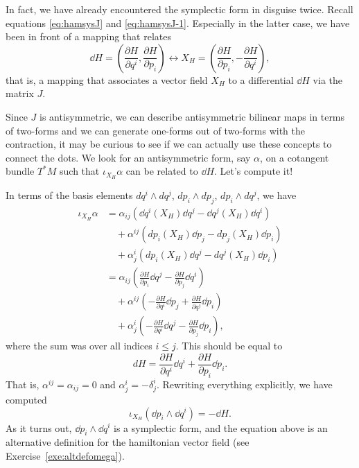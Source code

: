 \documentclass[english,fontsize=11pt,paper=b5]{scrbook}
\theoremstyle{definition}
\begin{document}
    In fact, we have already encountered the symplectic form in disguise twice.
    Recall equations \eqref{eq:hamsysJ} and \eqref{eq:hamsysJ-1}. Especially in the latter case, we have been in front of a mapping that relates
    \begin{equation}
      \dd H = \left(\frac{\partial H}{\partial q^i}, \frac{\partial H}{\partial p_i}\right) \leftrightarrow X_H = \left(\frac{\partial H}{\partial p_i}, - \frac{\partial H}{\partial q^i}\right),
    \end{equation}
    that is, a mapping that associates a vector field $X_H$ to a differential $\dd H$ via the matrix $J$.

    Since $J$ is antisymmetric, we can describe antisymmetric bilinear maps in terms of two-forms and we can generate one-forms out of two-forms with the contraction, it may be curious to see if we can actually use these concepts to connect the dots.
    We look for an antisymmetric form, say $\alpha$, on a cotangent bundle $T^*M$ such that $\iota_{X_H} \alpha$ can be related to $\dd H$. Let's compute it!

    In terms of the basis elements $dq^i\wedge dq^j$, $dp_i\wedge dp_j$, $dp_i\wedge dq^j$, we have
    \begin{align}
      \iota_{X_H} \alpha &= \alpha_{ij} (\dd q^i(X_H) \dd q^j - \dd q^j(X_H) \dd q^i) \\
                         &\quad + \alpha^{ij} (dp_i(X_H) \dd p_j - dp_j(X_H) \dd p_i) \\
                         &\quad + \alpha^i_j( dp_i(X_H) \dd q^j - dq^j(X_H) \dd p_i) \\
                         &= \alpha_{ij}\left(\frac{\partial H}{\partial p_i} \dd q^j - \frac{\partial H}{\partial p_j}\dd q^i\right) \\
                         &\quad + \alpha^{ij}\left(-\frac{\partial H}{\partial q^i}  \dd p_j + \frac{\partial H}{\partial q^j}  \dd p_i\right) \\
                         &\quad + \alpha^i_j\left(-\frac{\partial H}{\partial q^i} \dd q^j - \frac{\partial H}{\partial p_j} \dd p_i\right),
    \end{align}
    where the sum was over all indices $i\leq j$. This should be equal to
    \begin{equation}
      dH = \frac{\partial H}{\partial q^i} \dd q^i + \frac{\partial H}{\partial p_i} \dd p_i.
    \end{equation}
    That is, $\alpha^{ij}=\alpha_{ij} = 0$ and $\alpha^i_j = -\delta^i_j$.
    Rewriting everything explicitly, we have computed
    \begin{equation}
      \iota_{X_H}(\dd p_i\wedge \dd q^i) = - \dd H.
    \end{equation}
    As it turns out, $\dd p_i \wedge \dd q^i$ is a symplectic form, and the equation above is an alternative definition for the hamiltonian vector field (see Exercise~\ref{exe:altdefomega}).
\end{document}
